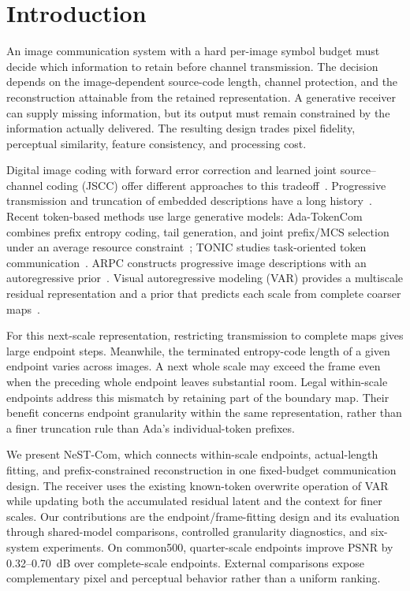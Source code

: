 \section{Introduction}
An image communication system with a hard per-image symbol budget must decide which information to retain before channel transmission. The decision depends on the image-dependent source-code length, channel protection, and the reconstruction attainable from the retained representation. A generative receiver can supply missing information, but its output must remain constrained by the information actually delivered. The resulting design trades pixel fidelity, perceptual similarity, feature consistency, and processing cost.

Digital image coding with forward error correction and learned joint source--channel coding (JSCC) offer different approaches to this tradeoff~\cite{deepjscc,swinjscc}. Progressive transmission and truncation of embedded descriptions have a long history~\cite{chande}. Recent token-based methods use large generative models: Ada-TokenCom combines prefix entropy coding, tail generation, and joint prefix/MCS selection under an average resource constraint~\cite{adatokencom}; TONIC studies task-oriented token communication~\cite{tonic}. ARPC constructs progressive image descriptions with an autoregressive prior~\cite{arpc}. Visual autoregressive modeling (VAR) provides a multiscale residual representation and a prior that predicts each scale from complete coarser maps~\cite{var}.

For this next-scale representation, restricting transmission to complete maps gives large endpoint steps. Meanwhile, the terminated entropy-code length of a given endpoint varies across images. A next whole scale may exceed the frame even when the preceding whole endpoint leaves substantial room. Legal within-scale endpoints address this mismatch by retaining part of the boundary map. Their benefit concerns endpoint granularity within the same representation, rather than a finer truncation rule than Ada's individual-token prefixes.

We present NeST-Com, which connects within-scale endpoints, actual-length fitting, and prefix-constrained reconstruction in one fixed-budget communication design. The receiver uses the existing known-token overwrite operation of VAR while updating both the accumulated residual latent and the context for finer scales. Our contributions are the endpoint/frame-fitting design and its evaluation through shared-model comparisons, controlled granularity diagnostics, and six-system experiments. On common500, quarter-scale endpoints improve PSNR by 0.32--0.70~dB over complete-scale endpoints. External comparisons expose complementary pixel and perceptual behavior rather than a uniform ranking.
